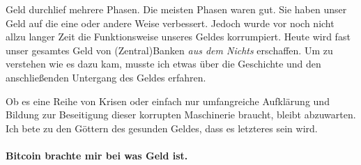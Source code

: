 Geld durchlief mehrere Phasen. Die meisten Phasen waren gut. Sie haben unser
Geld auf die eine oder andere Weise verbessert. Jedoch wurde vor noch nicht
allzu langer Zeit die Funktionsweise unseres Geldes korrumpiert. Heute wird fast
unser gesamtes Geld von (Zentral)Banken \textit{aus dem Nichts}
erschaffen. Um zu verstehen wie es dazu kam, musste ich etwas über die
Geschichte und den anschließenden Untergang des Geldes erfahren.

Ob es eine Reihe von Krisen oder einfach nur umfangreiche Aufklärung und Bildung
zur Beseitigung dieser korrupten Maschinerie braucht, bleibt abzuwarten. Ich
bete zu den Göttern des gesunden Geldes, dass es letzteres sein wird.

\paragraph{Bitcoin brachte mir bei was Geld ist.}

%
%
%
%
